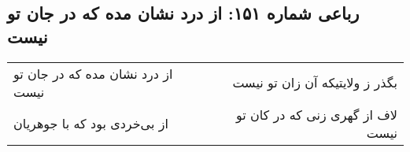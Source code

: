 \begin{center}
\section*{رباعی شماره ۱۵۱: از درد نشان مده که در جان تو نیست}
\label{sec:sh151}
\begin{longtable}{l p{0.5cm} r}
از درد نشان مده که در جان تو نیست
&&
بگذر ز ولایتیکه آن زان تو نیست
\\
از بی‌خردی بود که با جوهریان
&&
لاف از گهری زنی که در کان تو نیست
\\
\end{longtable}
\end{center}
